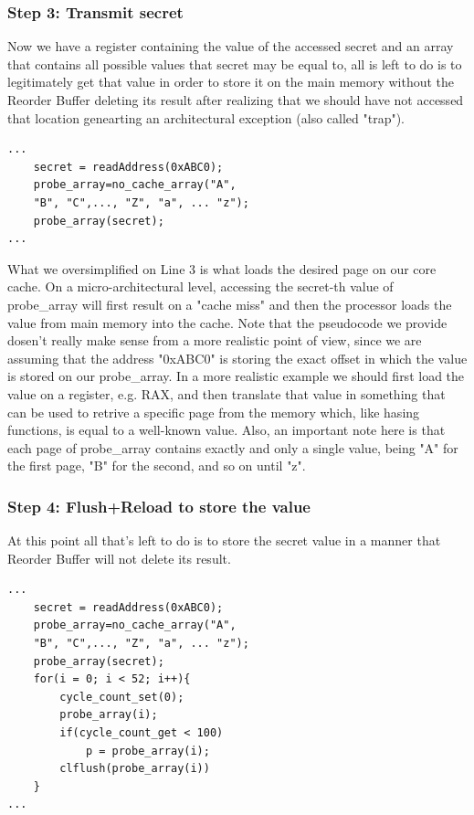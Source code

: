 \subsubsection{Step 3: Transmit secret}
Now we have a register containing the value of the accessed secret and an array that contains all possible values that secret may be equal to,
all is left to do is to legitimately get that value in order to store it on the main memory without the Reorder Buffer deleting its result
after realizing that we should have not accessed that location genearting an architectural exception (also called "trap").

\begin{verbatim}
...
    secret = readAddress(0xABC0);
    probe_array=no_cache_array("A",
	"B", "C",..., "Z", "a", ... "z");
    probe_array(secret);
...
\end{verbatim}

What we oversimplified on Line 3 is what loads the desired page on our core cache. On a micro-architectural level, accessing the secret-th value of probe\_array
will first result on a "cache miss" and then the processor loads the value from main memory into the cache.
Note that the pseudocode we provide dosen't really make sense from a more realistic point of view, since we are assuming that the address "0xABC0" is storing the exact
offset in which the value is stored on our probe\_array. In a more realistic example we should first load the value on a register, e.g. RAX,
and then translate that value in something that can be used to retrive a specific page from the memory which,
like hasing functions, is equal to a well-known value. Also, an important note here is that each page
of probe\_array contains exactly and only a single value, being "A" for the first page, "B" for the second, and so on until "z".

\subsubsection{Step 4: Flush+Reload to store the value}
At this point all that's left to do is to store the secret value in a manner that Reorder Buffer will not delete its result.
\begin{verbatim}
...
    secret = readAddress(0xABC0);
    probe_array=no_cache_array("A",
	"B", "C",..., "Z", "a", ... "z");
    probe_array(secret);
    for(i = 0; i < 52; i++){
        cycle_count_set(0);
        probe_array(i);
        if(cycle_count_get < 100)
            p = probe_array(i);
        clflush(probe_array(i))
    }
...
\end{verbatim}

